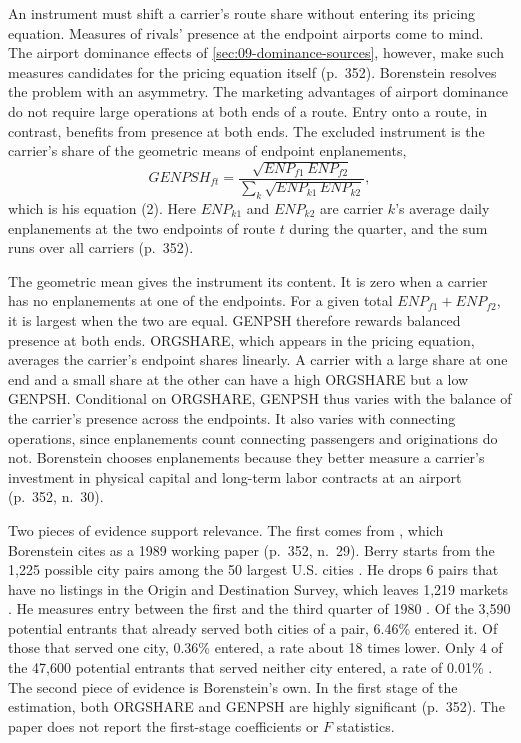  An instrument must shift a carrier's route share without entering its
pricing equation. Measures of rivals' presence at the endpoint airports come to mind. The airport dominance
effects of \cref{sec:09-dominance-sources}, however, make such measures candidates for the pricing equation
itself (p.~352). Borenstein resolves the problem with an asymmetry. The marketing advantages of airport
dominance do not require large operations at both ends of a route. Entry onto a route, in contrast, benefits
from presence at both ends. The excluded instrument is the carrier's share of the geometric means of endpoint
enplanements,
\begin{equation}\label{eq:09-genpsh}
\mathit{GENPSH}_{ft} = \frac{\sqrt{\mathit{ENP}_{f1}\, \mathit{ENP}_{f2}}}
{\sum_{k} \sqrt{\mathit{ENP}_{k1}\, \mathit{ENP}_{k2}}} ,
\end{equation}
which is his equation (2). Here $\mathit{ENP}_{k1}$ and $\mathit{ENP}_{k2}$ are carrier $k$'s average daily
enplanements at the two endpoints of route $t$ during the quarter, and the sum runs over all carriers
(p.~352).

The geometric mean gives the instrument its content. It is zero when a carrier has no enplanements at one of
the endpoints. For a given total $\mathit{ENP}_{f1} + \mathit{ENP}_{f2}$, it is largest when the two are equal.
GENPSH therefore rewards balanced presence at both ends. ORGSHARE, which appears in the pricing equation,
averages the carrier's endpoint shares linearly. A carrier with a large share at one end and a small share at
the other can have a high ORGSHARE but a low GENPSH. Conditional on ORGSHARE, GENPSH thus varies with the
balance of the carrier's presence across the endpoints. It also varies with connecting operations, since
enplanements count connecting passengers and originations do not. Borenstein chooses enplanements because they
better measure a carrier's investment in physical capital and long-term labor contracts at an airport
(p.~352, n.~30).

Two pieces of evidence support relevance. The first comes from \citet{Berry1992}, which Borenstein cites as a
1989 working paper (p.~352, n.~29). Berry starts from the 1,225 possible city pairs among the 50 largest U.S.
cities \citep[p.~903]{Berry1992}. He drops 6 pairs that have no listings in the Origin and Destination Survey,
which leaves 1,219 markets \citep[p.~903, n.~9, and p.~904]{Berry1992}. He measures entry between the first and the third quarter of 1980
\citep[p.~904]{Berry1992}. Of the 3,590
potential entrants that already served both cities of a pair, 6.46\% entered it. Of those that served one city,
0.36\% entered, a rate about 18 times lower. Only 4 of the 47,600 potential entrants that served neither city entered,
a rate of 0.01\% \citep[Table~III]{Berry1992}. The second piece of evidence is Borenstein's own. In the first
stage of the estimation, both ORGSHARE and GENPSH are highly significant (p.~352). The paper does not report the first-stage coefficients or $F$ statistics.

